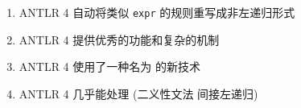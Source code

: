 
\begin{frame}{}

  \pause
\end{frame}

\begin{frame}{}
  \begin{center}
  \end{center}

  \begin{enumerate}[(1)]
    \setlength{\itemsep}{8pt}
    \pause
    \item ANTLR 4 自动将类似 \texttt{expr} 的规则重写成非左递归形式
    \pause
    \item ANTLR 4 提供优秀的功能和复杂的机制
    \pause
    \item ANTLR 4 使用了一种名为  的新技术
    \pause
    \item ANTLR 4 几乎能处理 (二义性文法\cmark \;\; 间接左递归\xmark)
  \end{enumerate}
\end{frame}


